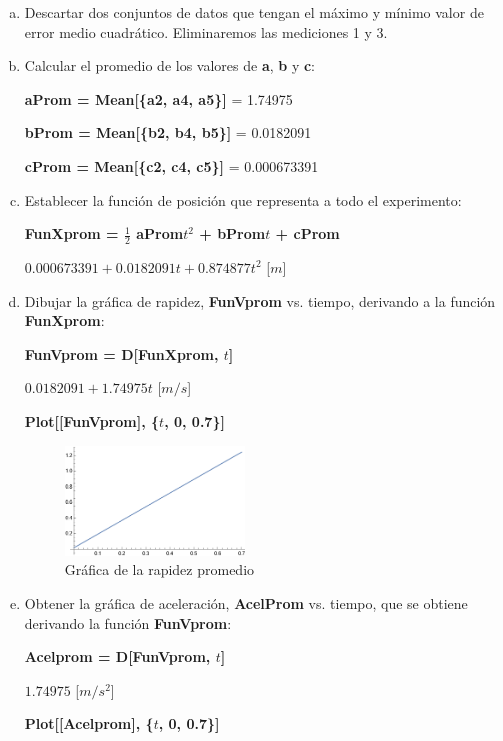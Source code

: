 \documentclass[12pt, titlepage]{report}
\begin{document}
    \begin{enumerate}[a), topsep=0.5cm, resume]
        \item Descartar dos conjuntos de datos que tengan el máximo y mínimo valor de error medio cuadrático. Eliminaremos las mediciones 1 y 3. 
        \item Calcular el promedio de los valores de \textbf{a}, \textbf{b} y \textbf{c}:
        
        \centerline{\textbf{aProm = Mean[\{a2, a4, a5\}]} = 1.74975}
        \centerline{\textbf{bProm = Mean[\{b2, b4, b5\}]} = 0.0182091}
        \centerline{\textbf{cProm = Mean[\{c2, c4, c5\}]} = 0.000673391}

        \item Establecer la función de posición que representa a todo el experimento:
        
        \centerline{\textbf{FunXprom =  $\frac{1}{2}$ aProm$t^2$ + bProm$t$ + cProm}}
        \centerline{$0.000673391 + 0.0182091 t + 0.874877 t^2$ [$m$]}

        \item Dibujar la gráfica de rapidez, \textbf{FunVprom} vs. tiempo, derivando a la función \textbf{FunXprom}:
        
        \centerline{\textbf{FunVprom = D[FunXprom, $t$]}}
        \centerline{$0.0182091 + 1.74975 t$ [$m/s$]}
        \centerline{\textbf{Plot[[FunVprom], \{$t$, 0, 0.7\}]}}

        \begin{figure}[ht]
            \centering
            \includegraphics[width=0.45\textwidth]{Graf_Rapidez.png}
            \caption{Gráfica de la rapidez promedio}
        \end{figure}

        \newpage
        \item Obtener la gráfica de aceleración, \textbf{AcelProm} vs. tiempo, que se obtiene derivando la función \textbf{FunVprom}:
        
        \centerline{\textbf{Acelprom = D[FunVprom, $t$]}}
        \centerline{$1.74975$ [$m/s^2$]} 
        \centerline{\textbf{Plot[[Acelprom], \{$t$, 0, 0.7\}]}}


\end{enumerate}
\end{document}
